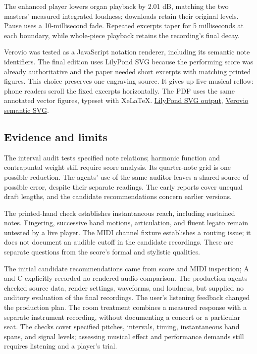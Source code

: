 \documentclass[11pt,a4paper]{article}
\begin{document}
The enhanced player lowers organ playback by 2.01 dB, matching the two masters' measured integrated loudness; downloads retain their original levels. Pause uses a 10-millisecond fade. Repeated excerpts taper for 5 milliseconds at each boundary, while whole-piece playback retains the recording's final decay.

Verovio was tested as a JavaScript notation renderer, including its semantic note identifiers. The final edition uses LilyPond SVG because the performing score was already authoritative and the paper needed short excerpts with matching printed figures. This choice preserves one engraving source. It gives up live musical reflow: phone readers scroll the fixed excerpts horizontally. The PDF uses the same annotated vector figures, typeset with XeLaTeX. \href{https://lilypond.org/doc/v2.26/Documentation/notation/alternative-output-formats}{LilyPond SVG output}, \href{https://book.verovio.org/interactive-notation/css-and-svg.html}{Verovio semantic SVG}.

\subsection{Evidence and limits}\label{evidence-and-limits}

The interval audit tests specified note relations; harmonic function and contrapuntal weight still require score analysis. Its quarter-note grid is one possible reduction. The agents' use of the same auditor leaves a shared source of possible error, despite their separate readings. The early reports cover unequal draft lengths, and the candidate recommendations concern earlier versions.

The printed-hand check establishes instantaneous reach, including sustained notes. Fingering, successive hand motions, articulation, and fluent legato remain untested by a live player. The MIDI channel fixture establishes a routing issue; it does not document an audible cutoff in the candidate recordings. These are separate questions from the score's formal and stylistic qualities.

The initial candidate recommendations came from score and MIDI inspection; A and C explicitly recorded no rendered-audio comparison. The production agents checked source data, render settings, waveforms, and loudness, but supplied no auditory evaluation of the final recordings. The user's listening feedback changed the production plan. The room treatment combines a measured response with a separate instrument recording, without documenting a concert or a particular seat. The checks cover specified pitches, intervals, timing, instantaneous hand spans, and signal levels; assessing musical effect and performance demands still requires listening and a player's trial.
\end{document}
